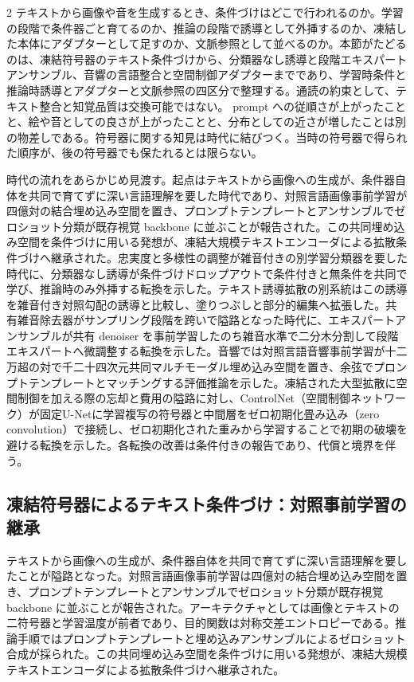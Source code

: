 \documentclass[lualatex,a4paper,10pt]{jlreq}
\begin{document}
\begin{multicols}{2}
\raggedcolumns
テキストから画像や音を生成するとき、条件づけはどこで行われるのか。学習の段階で条件器ごと育てるのか、推論の段階で誘導として外挿するのか、凍結した本体にアダプターとして足すのか、文脈参照として並べるのか。本節がたどるのは、凍結符号器のテキスト条件づけから、分類器なし誘導と段階エキスパートアンサンブル、音響の言語整合と空間制御アダプターまでであり、学習時条件と推論時誘導とアダプターと文脈参照の四区分で整理する\autocite{btd011,btd032}。通読の約束として、テキスト整合と知覚品質は交換可能ではない。 prompt への従順さが上がったことと、絵や音としての良さが上がったことと、分布としての近さが増したことは別の物差しである\autocite{btd011}。符号器に関する知見は時代に結びつく。当時の符号器で得られた順序が、後の符号器でも保たれるとは限らない。

時代の流れをあらかじめ見渡す。起点はテキストから画像への生成が、条件器自体を共同で育てずに深い言語理解を要した時代であり、対照言語画像事前学習が四億対の結合埋め込み空間を置き、プロンプトテンプレートとアンサンブルでゼロショット分類が既存視覚 backbone に並ぶことが報告された\autocite{btd031}。この共同埋め込み空間を条件づけに用いる発想が、凍結大規模テキストエンコーダによる拡散条件づけへ継承された\autocite{btd011}。忠実度と多様性の調整が雑音付きの別学習分類器を要した時代に、分類器なし誘導が条件づけドロップアウトで条件付きと無条件を共同で学び、推論時のみ外挿する転換を示した\autocite{btd032}。テキスト誘導拡散の別系統はこの誘導を雑音付き対照勾配の誘導と比較し、塗りつぶしと部分的編集へ拡張した\autocite{btd033}。共有雑音除去器がサンプリング段階を跨いで隘路となった時代に、エキスパートアンサンブルが共有 denoiser を事前学習したのち雑音水準で二分木分割して段階エキスパートへ微調整する転換を示した\autocite{btd034}。音響では対照言語音響事前学習が十二万超の対で千二十四次元共同マルチモーダル埋め込み空間を置き、余弦でプロンプトテンプレートとマッチングする評価推論を示した\autocite{btd035}。凍結された大型拡散に空間制御を加える際の忘却と費用の隘路に対し、ControlNet（空間制御ネットワーク）が固定U-Netに学習複写の符号器と中間層をゼロ初期化畳み込み（zero convolution）で接続し、ゼロ初期化された重みから学習することで初期の破壊を避ける転換を示した\autocite{btd036}。各転換の改善は条件付きの報告であり、代償と境界を伴う。
\end{multicols}

\subsection{凍結符号器によるテキスト条件づけ：対照事前学習の継承}
テキストから画像への生成が、条件器自体を共同で育てずに深い言語理解を要したことが隘路となった。対照言語画像事前学習は四億対の結合埋め込み空間を置き、プロンプトテンプレートとアンサンブルでゼロショット分類が既存視覚 backbone に並ぶことが報告された\autocite{btd031}。アーキテクチャとしては画像とテキストの二符号器と学習温度が前者であり、目的関数は対称交差エントロピーである\autocite{btd031}。推論手順ではプロンプトテンプレートと埋め込みアンサンブルによるゼロショット合成が採られた\autocite{btd031}。この共同埋め込み空間を条件づけに用いる発想が、凍結大規模テキストエンコーダによる拡散条件づけへ継承された\autocite{btd011}。
\end{document}
